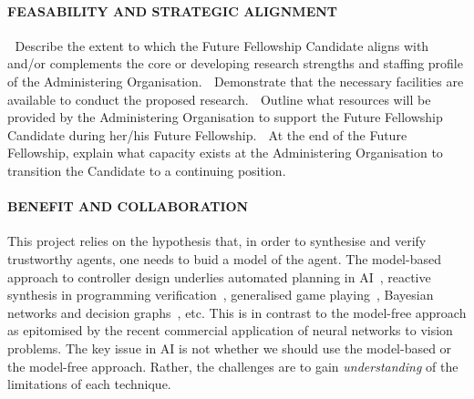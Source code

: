 \documentclass[a4paper,12pt,smallheadings]{scrartcl}
\begin{document}




\paragraph{FEASABILITY AND STRATEGIC ALIGNMENT}

 Describe the extent to which the Future Fellowship Candidate aligns with and/or
complements the core or developing research strengths and staffing profile of the
Administering Organisation.
 Demonstrate that the necessary facilities are available to conduct the proposed
research.
 Outline what resources will be provided by the Administering Organisation to support
the Future Fellowship Candidate during her/his Future Fellowship.
 At the end of the Future Fellowship, explain what capacity exists at the Administering
Organisation to transition the Candidate to a continuing position.


\paragraph{BENEFIT AND COLLABORATION}


This project relies on the hypothesis that, in order to synthesise and verify trustworthy agents, one needs to buid a model of the agent. The model-based approach to controller design underlies automated planning in AI~\cite{GeffnerBo13}, reactive synthesis in programming verification~\cite{DBLP:journals/jcss/BloemJPPS12}, generalised game playing~\cite{GGP}, Bayesian networks and decision graphs~\cite{Jensen2002}, etc. This is in contrast to the model-free approach as epitomised by the recent commercial application of neural networks to vision problems. The key issue in AI is not whether we should use the model-based or the model-free approach. Rather, the challenges are to gain \emph{understanding} of the limitations of each technique. 
\end{document}
